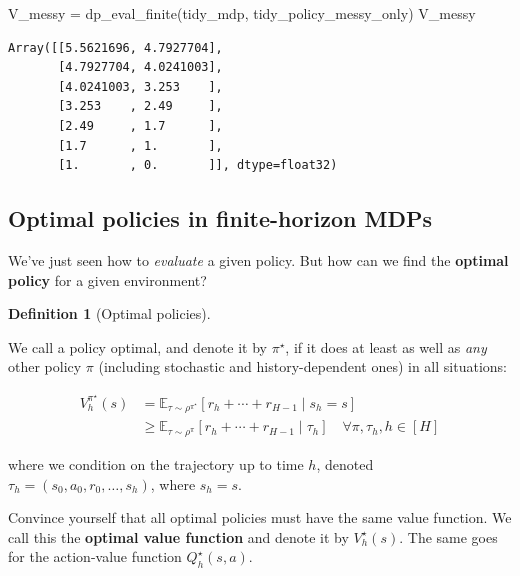 \documentclass[
  letterpaper,
  DIV=11,
  numbers=noendperiod]{scrreprt}
\newenvironment{Shaded}{\begin{snugshade}}{\end{snugshade}}
\newcommand{\NormalTok}[1]{\textcolor[rgb]{0.00,0.23,0.31}{#1}}
\newcommand{\OperatorTok}[1]{\textcolor[rgb]{0.37,0.37,0.37}{#1}}
\theoremstyle{plain}
\theoremstyle{plain}
\theoremstyle{definition}
\theoremstyle{definition}
\newtheorem{definition}{Definition}[chapter]
\theoremstyle{remark}
\begin{document}
\begin{Shaded}
\begin{Highlighting}[]
\NormalTok{V\_messy }\OperatorTok{=}\NormalTok{ dp\_eval\_finite(tidy\_mdp, tidy\_policy\_messy\_only)}
\NormalTok{V\_messy}
\end{Highlighting}
\end{Shaded}

\begin{verbatim}
Array([[5.5621696, 4.7927704],
       [4.7927704, 4.0241003],
       [4.0241003, 3.253    ],
       [3.253    , 2.49     ],
       [2.49     , 1.7      ],
       [1.7      , 1.       ],
       [1.       , 0.       ]], dtype=float32)
\end{verbatim}

\subsection{Optimal policies in finite-horizon
MDPs}\label{sec-opt_dynamic_programming}

We've just seen how to \emph{evaluate} a given policy. But how can we
find the \textbf{optimal policy} for a given environment?

\begin{definition}[Optimal
policies]\protect\hypertarget{def-optimal_policy_finite}{}\label{def-optimal_policy_finite}

We call a policy optimal, and denote it by \(\pi^\star\), if it does at
least as well as \emph{any} other policy \(\pi\) (including stochastic
and history-dependent ones) in all situations:

\[
\begin{aligned}
    V_h^{\pi^\star}(s) &= \mathbb{E}_{\tau \sim \rho^{\pi^{\star}}}[r_h+ \cdots + r_{H-1} \mid s_h= s] \\
    &\ge \mathbb{E}_{\tau \sim \rho^{\pi}}[r_h+ \cdots + r_{H-1} \mid \tau_h] \quad \forall \pi, \tau_h, h\in [H]
\end{aligned}
\]

where we condition on the trajectory up to time \(h\), denoted
\(\tau_h= (s_0, a_0, r_0, \dots, s_h)\), where \(s_h= s\).

\end{definition}

Convince yourself that all optimal policies must have the same value
function. We call this the \textbf{optimal value function} and denote it
by \(V_h^\star(s)\). The same goes for the action-value function
\(Q_h^\star(s, a)\).
\end{document}
